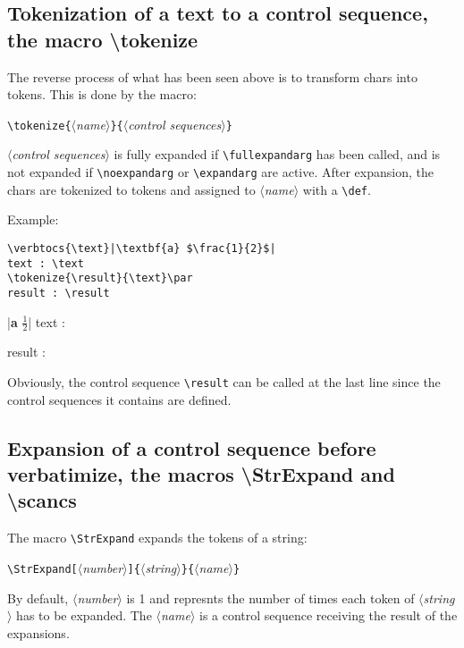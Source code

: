\documentclass[english,a4paper,10pt]{article}
\newcommand\argu[1]{$\langle$\textit{#1}$\rangle$}
\newcommand\ARGU[1]{\texttt{\{}\argu{#1}\texttt{\}}}
\newcommand\arguC[1]{\texttt{[}\argu{#1}\texttt{]}}
\newcommand\styleexercice{\footnotesize}
\newcommand\verbinline{\lstinline[basicstyle=\normalsize\ttfamily]}
\begin{document}
\subsection{Tokenization of a text to a control sequence, the macro \ttfamily\textbackslash tokenize}
The reverse process of what has been seen above is to transform chars into tokens. This is done by the macro:\par\nobreak\medskip
\hfill\verbinline|\tokenize|\ARGU{name}\ARGU{control sequences}\hfill{}
\smallskip

\argu{control sequences} is fully expanded if \verbinline|\fullexpandarg| has been called, and is not expanded if \verbinline|\noexpandarg| or \verbinline|\expandarg| are active. After expansion, the chars are tokenized to tokens and assigned to \argu{name} with a \verbinline|\def|.\medskip

Example:\par\nobreak\medskip
\begin{minipage}[c]{0.65\linewidth}
\begin{lstlisting}
\verbtocs{\text}|\textbf{a} $\frac{1}{2}$|
text : \text
\tokenize{\result}{\text}\par
result : \result
\end{lstlisting}%
\end{minipage}\hfill
\begin{minipage}[c]{0.35\linewidth}
	\styleexercice
	\verbtocs{\text}
	  |\textbf{a} $\frac{1}{2}$|
	text : \text
	\tokenize{\result}{\text}	\par
	result : \result
\end{minipage}%
\medskip

Obviously, the control sequence \verb|\result| can be called at the last line since the control sequences it contains are defined.

\subsection{Expansion of a control sequence before verbatimize, the macros {\ttfamily\textbackslash StrExpand} and {\ttfamily\textbackslash scancs}}
\label{scancs}
The macro \verbinline|\StrExpand| expands the tokens of a string:\par\nobreak\medskip
\verbinline|\StrExpand|\arguC{number}\ARGU{string}\ARGU{name}\smallskip

By default, \argu{number} is 1 and represnts the number of times each token of \argu{string} has to be expanded. The \argu{name} is a control sequence receiving the result of the expansions.\medskip
\end{document}
